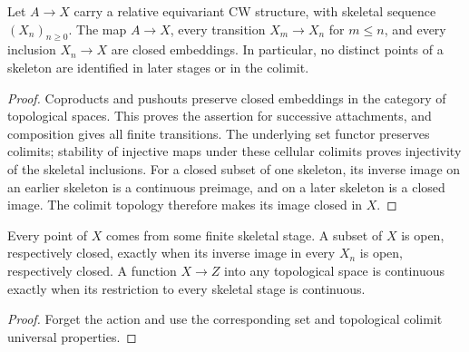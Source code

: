 \begin{proposition}\label{prop:cellular-closed-inclusions}
\leanok
Let $A\longrightarrow X$ carry a relative equivariant CW structure, with
skeletal sequence $(X_n)_{n\geq0}$. The map $A\longrightarrow X$, every
transition $X_m\longrightarrow X_n$ for $m\leq n$, and every inclusion
$X_n\longrightarrow X$ are closed embeddings. In particular, no distinct
points of a skeleton are identified in later stages or in the colimit.
\end{proposition}
\begin{proof}
\leanok
Coproducts and pushouts preserve closed embeddings in the category of
topological spaces. This proves the assertion for successive attachments,
and composition gives all finite transitions. The underlying set functor
preserves colimits; stability of injective maps under these cellular
colimits proves injectivity of the skeletal inclusions. For a closed subset
of one skeleton, its inverse image on an earlier skeleton is a continuous
preimage, and on a later skeleton is a closed image. The colimit topology
therefore makes its image closed in $X$.
\end{proof}

\begin{proposition}\label{prop:cellular-skeletal-topology}
\leanok
Every point of $X$ comes from some finite skeletal stage. A subset of $X$
is open, respectively closed, exactly when its inverse image in every
$X_n$ is open, respectively closed. A function $X\longrightarrow Z$ into
any topological space is continuous exactly when its restriction to every
skeletal stage is continuous.
\end{proposition}
\begin{proof}
\leanok
Forget the action and use the corresponding set and topological colimit
universal properties.
\end{proof}

